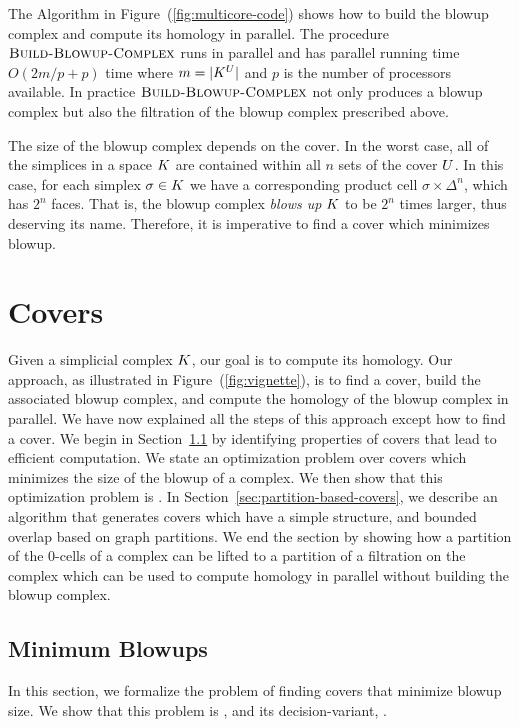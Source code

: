 \documentclass{elsarticle}
\begin{document}
The Algorithm in Figure~(\ref{fig:multicore-code}) shows how to build the blowup complex and compute its homology in parallel. 
The procedure $\textnormal{\scshape Build-Blowup-Complex}$ runs in parallel and has parallel running time $O(2m/p + p)$ time where $m = |K^{U}|$ and $p$ is the number of processors available. In practice $\textnormal{\scshape Build-Blowup-Complex}$ not only produces a blowup complex but also the filtration of the blowup complex prescribed above. 

The size of the blowup complex depends on the cover. In the worst case, all of 
the simplices in a space $K$ are contained within all $n$ sets of the cover 
$U$. In this case, for each simplex $\sigma \in K$ we have a corresponding 
product cell $\sigma \times \Delta^n$, which has $2^n$ faces. That is, the 
blowup complex \emph{blows up} $K$ to be $2^n$ times larger, thus deserving 
its name. Therefore, it is imperative to find a cover which minimizes blowup.

\section{Covers}
\label{sec:covers}
Given a simplicial complex $K$, our goal is to compute its homology.  
Our approach, as illustrated in Figure~(\ref{fig:vignette}), is to find a cover, 
build the associated blowup complex, and compute the homology of the blowup complex in 
parallel. We have now explained all the steps of this approach except how to find a cover. 
We begin in Section~\ref{sec:hardness} by identifying 
properties of covers that lead to efficient computation.
We state an optimization problem over covers which 
minimizes the size of the blowup of a complex. We then show that this optimization problem is \NPH{}.  
In Section~\ref{sec:partition-based-covers}, we describe an algorithm 
that generates covers which have a simple structure, and bounded overlap 
based on graph partitions. We end the section by showing how a partition of the 
0-cells of a complex can be lifted to a partition of a filtration on the complex 
which can be used to compute homology in parallel without building the blowup complex.
\subsection{Minimum Blowups}
\label{sec:hardness}
In this section, we formalize the problem of finding covers
that minimize blowup size. We show that this problem is \NPH{}, and its 
decision-variant, \NPC{}.
\end{document}
